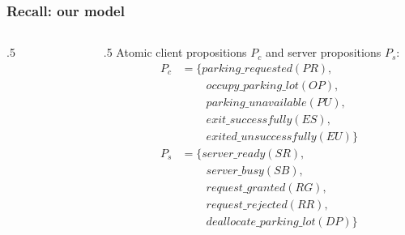 \documentclass [serif,professionalfont]{beamer}
\begin{document}
\begin{frame}\frametitle{Recall: our model}
    \begin{columns}[T] %
        \begin{column}{.5\textwidth}
            \begin{figure}
                \begin{center}
                    \scalebox{0.8}{}
                \end{center}
            \end{figure}
        \end{column}
        \hfill
        \begin{column}{.5\textwidth}
            Atomic client propositions $P_c$ and server propositions $P_s$:
            \small{
                \begin{align*}
                    P_c
                     & =\{parking\_requested (PR),            \\
                     & \qquad~occupy\_parking\_lot (OP),      \\
                     & \qquad~parking\_unavailable (PU),      \\
                     & \qquad~exit\_successfully (ES),        \\
                     & \qquad~exited\_unsuccessfully (EU)\}   \\
                    P_s
                     & =\{server\_ready (SR),                 \\
                     & \qquad~server\_busy(SB),               \\
                     & \qquad~request\_granted (RG),          \\
                     & \qquad~request\_rejected(RR),          \\
                     & \qquad~deallocate\_parking\_lot (DP)\}
                \end{align*}
            }
        \end{column}
    \end{columns}
\end{frame}
\end{document}
